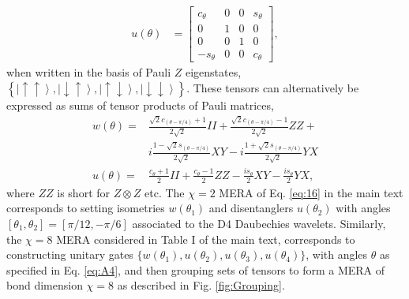 \documentclass[aps,prl,twocolumn,showpacs,superscriptaddress,floatfix,10pt]{revtex4-1}
\begin{document}
\begin{align}
u(\theta ) & = \left[ {\begin{array}{*{20}{c}}
  {{c_\theta }}&0&0&{{s_\theta }} \\ 
  0&1&0&0 \\ 
  0&0&1&0 \\ 
  { - {s_\theta }}&0&0&{{c_\theta }} 
\end{array}} \right], \label{eq:B13}
\end{align}
when written in the basis of Pauli $Z$ eigenstates, 
$\left\{ {\left| { \uparrow  \uparrow } \right\rangle ,\left| { \downarrow  \uparrow } \right\rangle ,\left| { \uparrow  \downarrow } \right\rangle ,\left| { \downarrow  \downarrow } \right\rangle } \right\}$. 
These tensors can alternatively be expressed as sums of tensor products of Pauli matrices,
\begin{align}
w(\theta) = & \frac{{\sqrt 2 {c_{(\theta  - \pi /4)}} + 1}}{{2\sqrt 2 }}II + \frac{{\sqrt 2 {c_{(\theta  - \pi /4)}} - 1}}{{2\sqrt 2 }}ZZ + \nonumber \\
& i\frac{{1 - \sqrt 2 {s_{(\theta  - \pi /4)}}}}{{2\sqrt 2 }}XY - i\frac{{1 + \sqrt 2 {s_{(\theta  - \pi /4)}}}}{{2\sqrt 2 }}YX \nonumber \\
u(\theta) = & \frac{{{c_\theta } + 1}}{2}II + \frac{{{c_\theta } - 1}}{2}ZZ - \frac{{i{s_\theta }}}{2}XY - \frac{{i{s_\theta }}}{2}YX, \label{eq:B14}
\end{align}
where $ZZ$ is short for $Z\otimes Z$ etc. 
The $\chi=2$ MERA of Eq. \ref{eq:16} in the main text corresponds to setting 
isometries $w(\theta_1)$ and disentanglers $u(\theta_2)$ with angles 
$[\theta_1,\theta_2] = [\pi/12,-\pi/6]$ 
associated to the D4 Daubechies wavelets. 
Similarly, the $\chi=8$ MERA considered in Table I of the main text, 
corresponds to constructing unitary gates $\{w(\theta_1), u(\theta_2), u(\theta_3), u(\theta_4)\}$, 
with angles $\theta$ as specified in Eq. \ref{eq:A4}, and then grouping sets of tensors to form a 
MERA of bond dimension $\chi=8$ as described in Fig. \ref{fig:Grouping}. 
\end{document}
